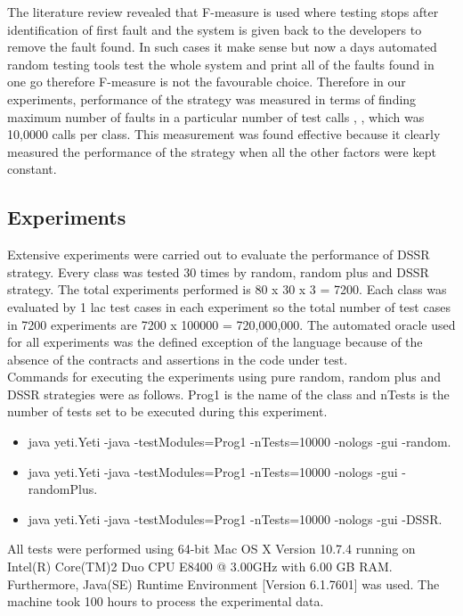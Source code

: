 \documentclass[conference]{IEEEtran}
\begin{document}
The literature review revealed that F-measure is used where testing stops after identification of first fault and the system is given back to the developers to remove the fault found. In such cases it make sense but now a days automated random testing tools test the whole system and print all of the faults found in one go therefore F-measure is not the favourable choice. Therefore in our experiments, performance of the strategy was measured in terms of finding maximum number of faults in a particular number of test calls  \cite{Ciupa2007}, \cite{Pacheco2007a}, \cite{Ciupa2008b} which was 10,0000 calls per class. This measurement was found effective because it clearly measured the performance of the strategy when all the other factors were kept constant.

\subsection{Experiments}
\indent Extensive experiments were carried out to evaluate the performance of DSSR strategy. Every class was tested 30 times by random, random plus and DSSR strategy. The total experiments performed is 80 x 30 x 3 = 7200. Each class was evaluated by 1 lac test cases in each experiment so the total number of test cases in 7200 experiments are 7200 x 100000 = 720,000,000. The automated oracle used for all experiments was the defined exception of the language because of the absence of the contracts and assertions in the code under test.\\
\indent Commands for executing the experiments using pure random, random plus and DSSR strategies were as follows. Prog1 is the name of the class and nTests is the number of tests set to be executed during this experiment.\\

\begingroup
    \fontsize{7pt}{10pt}\selectfont
\begin{itemize}
\item java yeti.Yeti -java -testModules=Prog1 -nTests=10000 -nologs -gui -random.
\item java yeti.Yeti -java -testModules=Prog1 -nTests=10000 -nologs -gui -randomPlus.
\item java yeti.Yeti -java -testModules=Prog1 -nTests=10000 -nologs -gui -DSSR.\\
\end{itemize}
\endgroup



All tests were performed using 64-bit Mac OS X Version 10.7.4 running on Intel(R) Core(TM)2 Duo CPU E8400 @ 3.00GHz with 6.00 GB RAM. Furthermore, Java(SE) Runtime Environment [Version 6.1.7601] was used. The machine took 100 hours to process the experimental data.\\
\end{document}

